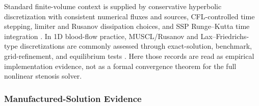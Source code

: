 \begin{table}[!htb]
    \centering
    \scriptsize
    \caption{Synthetic validation of the
    \texttt{CrossSectionQuadratureOperator}. Errors are absolute differences
    against analytic constant or affine references on the synthetic tetrahedron;
    the plane-shift rows report changes relative to the $z=0.5$ affine cut.
    The source table is
    \texttt{cross-section-operator-validation.csv}.}
    \label{tab:t1-cross-section-operator-validation}
\end{table}

Standard finite-volume context is supplied by conservative hyperbolic
discretization with consistent numerical fluxes and sources, CFL-controlled time
stepping, limiter and Rusanov dissipation choices, and SSP Runge--Kutta time
integration \cite{LeVeque2002FiniteVolumeMethodsForHyperbolicProblems}. In 1D
blood-flow practice, MUSCL/Rusanov and Lax--Friedrichs-type discretizations are
commonly assessed through exact-solution, benchmark, grid-refinement, and
equilibrium tests
\cite{Wang2014BloodFlowNetworks,BeckersKolbe2025LaxFriedrichsHemodynamics,BoileauEtAl2015Benchmark,BenemeritoEtAl2024OpenBF,LuccaEtAl2025FFRPrediction}.
Here those records are read as empirical implementation evidence, not as a
formal convergence theorem for the full nonlinear stenosis solver.

\subsubsection{Manufactured-Solution Evidence}
\label{subsec:mms-verification}

